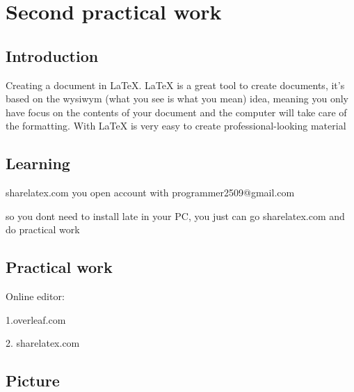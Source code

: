 \documentclass{report}
\begin{document}
\chapter{Second practical work}
\section{Introduction}

Creating a document in LaTeX. LaTeX is a great tool to create documents, it's based on the wysiwym (what you see is what you mean) idea, meaning you only have focus on the contents of your document and the computer will take care of the formatting. With LaTeX is very easy to create professional-looking material

\section{Learning}

sharelatex.com
you open account with programmer2509@gmail.com

so you dont need to install late in your PC, you just can go sharelatex.com and do practical work

\section{Practical work}

Online editor:

1.overleaf.com

2. sharelatex.com



\section{Picture}
\end{document}
